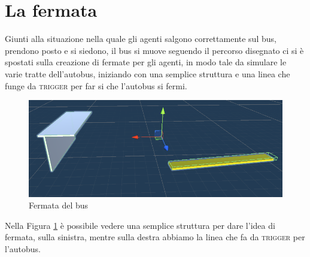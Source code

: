 \documentclass[12pt, openany]{book}
\begin{document}
	\section{La fermata}
	Giunti alla situazione nella quale gli agenti salgono correttamente sul bus, prendono posto e si siedono, il bus si muove seguendo il percorso disegnato ci si è spostati sulla creazione di fermate per gli agenti, in modo tale da simulare le varie tratte dell'autobus, iniziando con una semplice struttura e una linea che funge da \textsc{trigger} per far si che l'autobus si fermi.\\
	\begin{figure}[H]
		\centering
		\includegraphics[width=1\linewidth]{"Immagini/BusStopNoSA.png"}
		\caption{Fermata del bus}
		\label{fig:BusStopNoSA}
	\end{figure}
	Nella Figura \ref{fig:BusStopNoSA} è possibile vedere una semplice struttura per dare l'idea di fermata, sulla sinistra, mentre sulla destra abbiamo la linea che fa da \textsc{trigger} per l'autobus.\\
	
\end{document}
